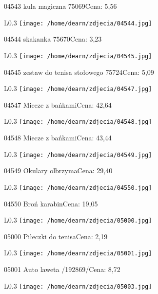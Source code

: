04543 kula magiczna 75069Cena: 5,56\newline
\begin{wrapfigure}{L}{0.3\textwidth}
\texttt{[image: /home/dearn/zdjecia/04544.jpg]}
\end{wrapfigure}
04544 skakanka 75670Cena: 3,23\newline
\begin{wrapfigure}{L}{0.3\textwidth}
\texttt{[image: /home/dearn/zdjecia/04545.jpg]}
\end{wrapfigure}
04545 zestaw do tenisa stołowego 75724Cena: 5,09\newline
\begin{wrapfigure}{L}{0.3\textwidth}
\texttt{[image: /home/dearn/zdjecia/04547.jpg]}
\end{wrapfigure}
04547 Miecze z bańkamiCena: 42,64\newline
\begin{wrapfigure}{L}{0.3\textwidth}
\texttt{[image: /home/dearn/zdjecia/04548.jpg]}
\end{wrapfigure}
04548 Miecze z bańkamiCena: 43,44\newline
\begin{wrapfigure}{L}{0.3\textwidth}
\texttt{[image: /home/dearn/zdjecia/04549.jpg]}
\end{wrapfigure}
04549 Okulary olbrzymaCena: 29,40\newline
\begin{wrapfigure}{L}{0.3\textwidth}
\texttt{[image: /home/dearn/zdjecia/04550.jpg]}
\end{wrapfigure}
04550 Broń karabinCena: 19,05\newline
\begin{wrapfigure}{L}{0.3\textwidth}
\texttt{[image: /home/dearn/zdjecia/05000.jpg]}
\end{wrapfigure}
05000 Piłeczki do tenisaCena: 2,19\newline
\begin{wrapfigure}{L}{0.3\textwidth}
\texttt{[image: /home/dearn/zdjecia/05001.jpg]}
\end{wrapfigure}
05001 Auto laweta /192869/Cena: 8,72\newline
\begin{wrapfigure}{L}{0.3\textwidth}
\texttt{[image: /home/dearn/zdjecia/05003.jpg]}
\end{wrapfigure}
